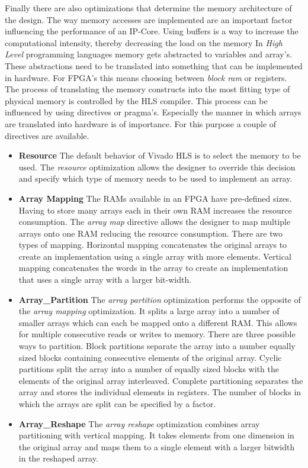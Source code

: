 Finally there are also optimizations that determine the memory architecture of the design. The way memory accesses are implemented are an important factor influencing the performance of an IP-Core. Using buffers is a way to increase the computational intensity, thereby decreasing the load on the memory 
In \emph{High Level} programming languages memory gets abstracted to variables and array's. These abstractions need to be translated into something that can be implemented in hardware. For FPGA's this means choosing between \emph{block ram} or registers. The process of translating the memory constructs into the most fitting type of physical memory is controlled by the HLS compiler. This process can be influenced by using directives or pragma's. Especially the manner in which arrays are translated into hardware is of importance. For this purpose a couple of directives are available.\\

\begin{itemize}

	\item 	\textbf{Resource} The default behavior of Vivado HLS is to select the memory to be used. The \emph{resource} optimization allows the designer to override this decision and specify which type of memory needs to be used to implement an array. 

	\item 	\textbf{Array Mapping} The RAMs available in an FPGA have pre-defined sizes. Having to store many arrays each in their own RAM increases the resource consumption. The \emph{array map} directive allows the designer to map multiple arrays onto one RAM reducing the resource consumption. There are two types of mapping. Horizontal mapping concatenates the original arrays to create an implementation using a single array with more elements. Vertical mapping concatenates the words in the array to create an implementation that uses a single array with a larger bit-width. 
	
	\item 	\textbf{Array\_Partition} The \emph{array partition} optimization performs the opposite of the \emph{array mapping} optimization. It splits a large array into a number of smaller arrays which can each be mapped onto a different RAM. This allows for multiple consecutive reads or writes to memory. There are three possible ways to partition. Block partitions separate the array into a number equally sized blocks containing consecutive elements of the original array. Cyclic partitions split the array into a number of equally sized blocks with the elements of the original array interleaved. Complete partitioning separates the array and stores the individual elements in registers. The number of blocks in which the arrays are split can be specified by a factor.

	\item 	\textbf{Array\_Reshape} The \emph{array reshape} optimization combines array partitioning with vertical mapping. It takes elements from one dimension in the original array and maps them to a single element with a larger bitwidth in the reshaped array. 

\end{itemize}

